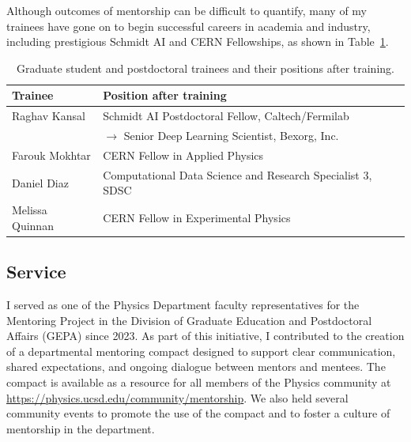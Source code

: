 \documentclass[11pt,letterpaper,notitlepage]{article}
\begin{document}
Although outcomes of mentorship can be difficult to quantify, many of my trainees have gone on to begin successful careers in academia and industry, including prestigious Schmidt AI and CERN Fellowships, as shown in Table~\ref{tab:alumni}.

\begin{table}[htpb]
    \centering
    \caption{Graduate student and postdoctoral trainees and their positions after training.}
    \begin{tabular}{ll}
        Trainee         & Position after training                                    \\\hline
        Raghav Kansal   & Schmidt AI Postdoctoral Fellow, Caltech/Fermilab           \\
                        & $\to$ Senior Deep Learning Scientist, Bexorg, Inc.         \\
        Farouk Mokhtar  & CERN Fellow in Applied Physics                             \\
        Daniel Diaz     & Computational Data Science and Research Specialist 3, SDSC \\
        Melissa Quinnan & CERN Fellow in Experimental Physics                        \\
    \end{tabular}
    \label{tab:alumni}
\end{table}

\vspace{-1ex}
\subsection*{Service}

I served as one of the Physics Department faculty representatives for the Mentoring Project in the Division of Graduate Education and Postdoctoral Affairs (GEPA) since 2023.
As part of this initiative, I contributed to the creation of a departmental mentoring compact designed to support clear communication, shared expectations, and ongoing dialogue between mentors and mentees.
The compact is available as a resource for all members of the Physics community at\\\href{https://physics.ucsd.edu/community/mentorship}{https://physics.ucsd.edu/community/mentorship}.
We also held several community events to promote the use of the compact and to foster a culture of mentorship in the department.
\end{document}

